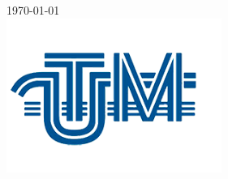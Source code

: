 \documentclass{article}
\begin{document}
\begin{titlepage}
    {\large \today}\\[2cm] %

    \includegraphics[width=7cm]{utm2.png}\\[1cm] %


    \vfill %

  \end{titlepage}


  \newpage
\end{document}
